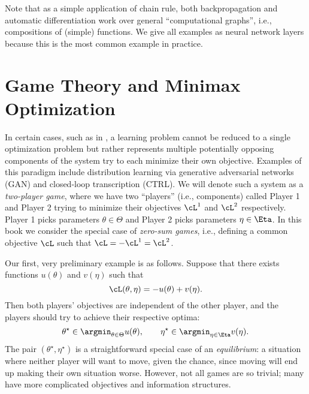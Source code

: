 \documentclass[../../book-main.tex]{subfiles}
\begin{document}
Note that as a simple application of chain rule, both backpropagation and automatic differentiation work over general ``computational graphs'', i.e., compositions of (simple) functions. We give all examples as neural network layers because this is the most common example in practice.



















        
        
        
        


















\section{Game Theory and Minimax Optimization} \label{sec:minimax}\label{sec:game_theory}

In certain cases, such as in , a learning problem cannot be reduced to a single optimization problem but rather represents multiple potentially opposing components of the system try to each minimize their own objective. Examples of this paradigm include distribution learning via generative adversarial networks (GAN) and closed-loop transcription (CTRL). We will denote such a system as a \textit{two-player game}, where we have two ``players'' (i.e., components) called Player 1 and Player 2 trying to minimize their objectives \(\cL^{1}\) and \(\cL^{2}\) respectively. Player 1 picks parameters \(\theta \in \Theta\) and Player 2 picks parameters \(\eta \in \Eta\). In this book we consider the special case of \textit{zero-sum games}, i.e., defining a common objective \(\cL\) such that \(\cL = -\cL^{1} = \cL^{2}\).

Our first, very preliminary example is as follows. Suppose that there exists functions \(u(\theta)\) and \(v(\eta)\) such that 
\begin{equation}
    \cL(\theta, \eta) = -u(\theta) + v(\eta).
\end{equation}
Then both players' objectives are independent of the other player, and the players should try to achieve their respective optima:
\begin{equation}
    \theta^{\star} \in \argmin_{\theta \in \Theta}u(\theta), \qquad \eta^{\star} \in \argmin_{\eta \in \Eta}v(\eta).
\end{equation}
The pair \((\theta^{\star}, \eta^{\star})\) is a straightforward special case of an \textit{equilibrium}: a situation where neither player will want to move, given the chance, since moving will end up making their own situation worse. However, not all games are so trivial; many have more complicated objectives and information structures.
\end{document}
